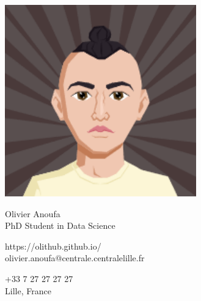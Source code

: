 \documentclass{article}
\begin{document}
\centering \includegraphics[width=.05\linewidth]{logo}\\[5pt]
\parbox{2in}{\Large \centering Olivier Anoufa\\[1pt]
\normalsize PhD Student in Data Science}

\vfill
\raggedright\begin{multicols}{2}
https://olithub.github.io/\\
olivier.anoufa@centrale.centralelille.fr

\columnbreak\raggedleft+33 7 27 27 27 27\\Lille, France%
\end{multicols}%
\end{document}
